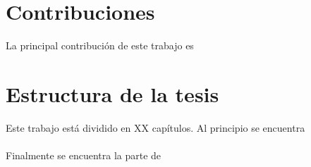 
\section{Contribuciones}

La principal contribución de este trabajo es 
\blindtext

\section{Estructura de la tesis}

Este trabajo está dividido en XX capítulos. Al principio se encuentra 
\\\\
Finalmente se encuentra la parte de 
